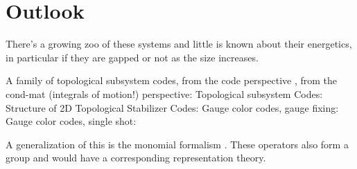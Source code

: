 \documentclass[12pt]{article}
\begin{document}
\section{Outlook}

There's a growing zoo of these systems and little is known
about their energetics, in particular if they are gapped or
not as the size increases.

A family of topological subsystem codes,
from the code perspective  \cite{Bombin2010,Bombin2014,Suchara2011},
from the cond-mat (integrals of motion!) perspective:
\cite{Kargarian2010,Bombin2009}
Topological subsystem Codes: \cite{Suchara2011}
Structure of 2D Topological Stabilizer Codes: \cite{Bombin2014}
Gauge color codes, gauge fixing: \cite{Bombin2015}
Gauge color codes, single shot: \cite{Bombin2015single}

A generalization of this is the 
monomial formalism \cite{Van2011}. 
These operators also form a group and would
have a corresponding representation theory.





{}

\end{document}

